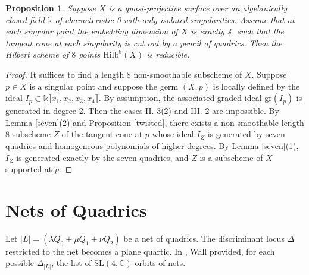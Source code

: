 \documentclass{amsart}[12pt]
\newtheorem{prop}[theorem]{Proposition}
\theoremstyle{definition}
\theoremstyle{remark}
\numberwithin{equation}{section}
\newcommand{\abs}[1]{\lvert#1\rvert}
\begin{document}
\begin{prop}
Suppose $X$ is a quasi-projective surface over an algebraically closed field $\mathbb{k}$ of characteristic 0 with only isolated singularities. Assume that at each singular point the embedding dimension of $X$ is exactly 4, such that the tangent cone at each singularity is cut out by a pencil of quadrics. Then the Hilbert scheme of $8$ points $\mathrm{Hilb}^8(X)$ is reducible. 
\end{prop}
\begin{proof}
It suffices to find a length 8 non-smoothable subscheme of $X$. Suppose $p \in X$ is a singular point and suppose the germ $(X, p)$ is locally defined by the ideal $I_p \subset \mathbb{k}\llbracket x_1, x_2, x_3, x_4 \rrbracket$. By assumption, the associated graded ideal $\mathrm{gr}(I_p)$ is generated in degree 2. Then the cases II. 3(2) and III. 2 are impossible. By Lemma \ref{seven}(2) and Proposition \ref{twisted}, there exists a non-smoothable length 8 subscheme $Z$ of the tangent cone at $p$ whose ideal $I_Z$ is generated by seven quadrics and homogeneous polynomials of higher degrees. By Lemma \ref{seven}(1), $I_Z$ is generated exactly by the seven quadrics, and $Z$ is a subscheme of $X$ supported at $p$. 
\end{proof}

\section{Nets of Quadrics}
Let $\abs{L} = (\lambda Q_0 + \mu Q_1 + \nu Q_2)$ be a net of quadrics. The discriminant locus $\Delta$ restricted to the net becomes a plane quartic. In \cite{W78}, Wall provided, for each possible $\Delta_{\abs{L}}$, the list of $\mathrm{SL}(4, \mathbb{C})$-orbits of nets. 
\end{document}
